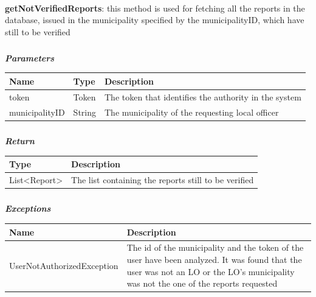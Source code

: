 					\paragraph{}
							\textbf{getNotVerifiedReports}: this method is used for fetching all the reports in the
database, issued in the municipality specified by the municipalityID, which have still to be verified
							\subparagraph{}
							\textcolor{myBlue}{\textit{\textbf{Parameters}}}
							\vspace{-2mm}
								\begin{table}[!h]
									\begin{tabular}{L{0.2\textwidth}L{0.15\textwidth}L{0.53\textwidth}}
										\toprule
										\textbf{Name} & \textbf{Type} & \textbf{Description} \\
										\midrule
								  		token & Token & The token that identifies the authority in the system \\
								  		municipalityID & String & The municipality of the requesting local officer \\
								 		\bottomrule
									\end{tabular}
								\end{table}
							\subparagraph{}
							\vspace{-6mm}
								\textcolor{myGreen}{\textit{\textbf{Return}}}
								\vspace{-2mm}
									\begin{table}[!h]
									\begin{tabular}{L{0.2\textwidth}L{0.72\textwidth}}
										\toprule
										\textbf{Type} & \textbf{Description} \\
										\midrule
								  		List<Report> & The list containing the reports still to be verified \\
								 		\bottomrule
									\end{tabular}
								\end{table}
							\subparagraph{}
							\vspace{-6mm}
								\textcolor{myRed}{\textit{\textbf{Exceptions}}}
								\vspace{-2mm}
									\begin{table}[!h]
									\begin{tabular}{L{0.4\textwidth}L{0.52\textwidth}}
										\toprule
										\textbf{Name} & \textbf{Description} \\
										\midrule
										UserNotAuthorizedException & The id of the municipality and the token of the user have been analyzed. It was found that the user was not an LO or the LO's municipality was not the one of the reports requested \\
								 		\bottomrule
									\end{tabular}
								\end{table}
								
